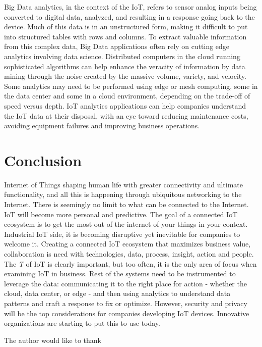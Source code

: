 \documentclass[sigconf]{acmart}
\begin{document}
Big Data analytics, in the context of the IoT, refers to sensor analog inputs being converted to digital data, analyzed, and resulting in a response going back to the device. Much of this data is in an unstructured form, making it difficult to put into structured tables with rows and columns. To extract valuable information from this complex data, Big Data applications often rely on cutting edge analytics involving data science. Distributed computers in the cloud running sophisticated algorithms can help enhance the veracity of information by data mining through the noise created by the massive volume, variety, and velocity. Some analytics may need to be performed using edge or mesh computing, some in the data center and some in a cloud environment, depending on the trade-off of speed versus depth. IoT analytics applications can help companies understand the IoT data at their disposal, with an eye toward reducing maintenance costs, avoiding equipment failures and improving business operations. 


\section{Conclusion}

Internet of Things shaping human life with greater connectivity and ultimate functionality, and all this is happening through ubiquitous networking to the Internet. There is seemingly no limit to what can be connected to the Internet. IoT will become more personal and predictive. The goal of a connected IoT ecosystem is to get the most out of the internet of your things in your context. Industrial IoT side, it is becoming disruptive yet inevitable for companies to welcome it. Creating a connected IoT ecosystem that maximizes business value, collaboration is need with technologies, data, process, insight, action and people. The {\em T} of IoT is clearly important, but too often, it is the only area of focus when examining IoT in business. Rest of the systems need to be instrumented to leverage the data: communicating it to the right place for action - whether the cloud, data center, or edge - and then using analytics to understand data patterns and craft a response to fix or optimize. However, security and privacy will be the top considerations for companies developing IoT devices. Innovative organizations are starting to put this to use today.

\begin{acks}

  The author would like to thank 

\end{acks}


 
\end{document}
